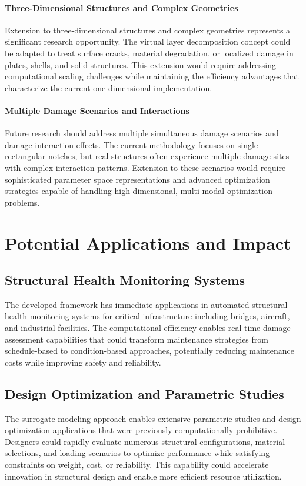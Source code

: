 \paragraph{Three-Dimensional Structures and Complex Geometries}
Extension to three-dimensional structures and complex geometries represents a significant research opportunity. The virtual layer decomposition concept could be adapted to treat surface cracks, material degradation, or localized damage in plates, shells, and solid structures. This extension would require addressing computational scaling challenges while maintaining the efficiency advantages that characterize the current one-dimensional implementation.

\paragraph{Multiple Damage Scenarios and Interactions}
Future research should address multiple simultaneous damage scenarios and damage interaction effects. The current methodology focuses on single rectangular notches, but real structures often experience multiple damage sites with complex interaction patterns. Extension to these scenarios would require sophisticated parameter space representations and advanced optimization strategies capable of handling high-dimensional, multi-modal optimization problems.

\section{Potential Applications and Impact}
\subsection{Structural Health Monitoring Systems}
The developed framework has immediate applications in automated structural health monitoring systems for critical infrastructure including bridges, aircraft, and industrial facilities. The computational efficiency enables real-time damage assessment capabilities that could transform maintenance strategies from schedule-based to condition-based approaches, potentially reducing maintenance costs while improving safety and reliability.

\subsection{Design Optimization and Parametric Studies}
The surrogate modeling approach enables extensive parametric studies and design optimization applications that were previously computationally prohibitive. Designers could rapidly evaluate numerous structural configurations, material selections, and loading scenarios to optimize performance while satisfying constraints on weight, cost, or reliability. This capability could accelerate innovation in structural design and enable more efficient resource utilization.

